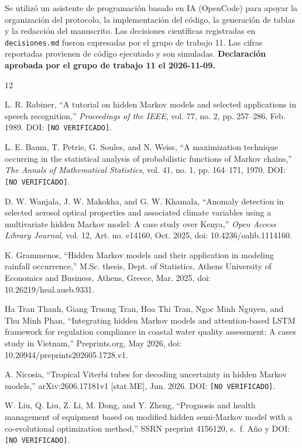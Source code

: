 \documentclass[11pt,a4paper]{article}
\begin{document}
Se utilizó un asistente de programación basado en IA (OpenCode) para apoyar la organización del protocolo, la implementación del código, la generación de tablas y la redacción del manuscrito. Las decisiones científicas registradas en \texttt{decisiones.md} fueron expresadas por el grupo de trabajo 11. Las cifras reportadas provienen de código ejecutado y son simuladas. \textbf{Declaración aprobada por el grupo de trabajo 11 el 2026-11-09.}

\begin{thebibliography}{12}

L. R. Rabiner, ``A tutorial on hidden Markov models and selected applications in speech recognition,'' \emph{Proceedings of the IEEE}, vol. 77, no. 2, pp. 257--286, Feb. 1989. DOI: \texttt{[NO VERIFICADO]}.

L. E. Baum, T. Petrie, G. Soules, and N. Weiss, ``A maximization technique occurring in the statistical analysis of probabilistic functions of Markov chains,'' \emph{The Annals of Mathematical Statistics}, vol. 41, no. 1, pp. 164--171, 1970. DOI: \texttt{[NO VERIFICADO]}.

D. W. Wanjala, J. W. Makokha, and G. W. Khamala, ``Anomaly detection in selected aerosol optical properties and associated climate variables using a multivariate hidden Markov model: A case study over Kenya,'' \emph{Open Access Library Journal}, vol. 12, Art. no. e14160, Oct. 2025, doi: 10.4236/oalib.1114160.

K. Grammenos, ``Hidden Markov models and their application in modeling rainfall occurrence,'' M.Sc. thesis, Dept. of Statistics, Athens University of Economics and Business, Athens, Greece, Mar. 2025, doi: 10.26219/heal.aueb.9331.

Ha Tran Thanh, Giang Truong Tran, Hoa Thi Tran, Ngoc Minh Nguyen, and Thu Minh Phan, ``Integrating hidden Markov models and attention-based LSTM framework for regulation compliance in coastal water quality assessment: A cases study in Vietnam,'' Preprints.org, May 2026, doi: 10.20944/preprints202605.1728.v1.

A. Nicosia, ``Tropical Viterbi tubes for decoding uncertainty in hidden Markov models,'' arXiv:2606.17181v1 [stat.ME], Jun. 2026. DOI: \texttt{[NO VERIFICADO]}.

W. Liu, Q. Liu, Z. Li, M. Dong, and Y. Zheng, ``Prognosis and health management of equipment based on modified hidden semi-Markov model with a co-evolutional optimization method,'' SSRN preprint 4156120, s.~f. Año y DOI: \texttt{[NO VERIFICADO]}.


\end{thebibliography}
\end{document}
